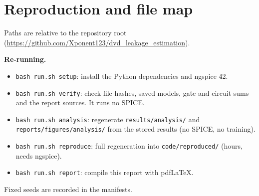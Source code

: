 \section{Reproduction and file map}
\label{sec:app}

Paths are relative to the repository root (\url{https://github.com/Xponent123/dvd_leakage_estimation}).

\textbf{Re-running.}
\begin{itemize}
\item \texttt{bash run.sh setup}: install the Python dependencies and ngspice 42.
\item \texttt{bash run.sh verify}: check file hashes, saved models, gate and circuit sums and the report sources. It runs no SPICE.
\item \texttt{bash run.sh analysis}: regenerate \texttt{results/analysis/} and \texttt{reports/figures/analysis/} from the stored results (no SPICE, no training).
\item \texttt{bash run.sh reproduce}: full regeneration into \texttt{code/reproduced/} (hours, needs ngspice).
\item \texttt{bash run.sh report}: compile this report with pdfLaTeX.
\end{itemize}
Fixed seeds are recorded in the manifests.

